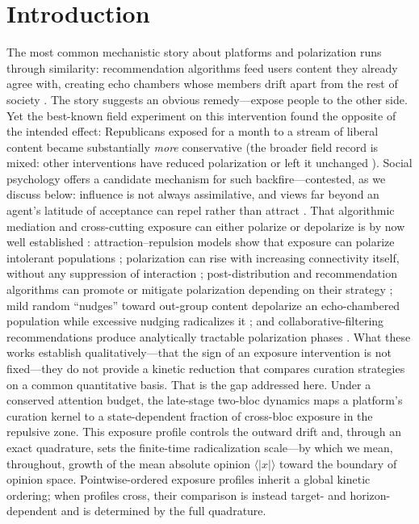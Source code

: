 \documentclass[5p,times,twocolumn]{elsarticle}
\begin{document}
\section{Introduction}
\label{sec:intro}

The most common mechanistic story about platforms and polarization runs
through similarity: recommendation algorithms feed users content they
already agree with, creating echo chambers whose members drift apart from
the rest of society \citep{sirbu2019, santos2021, baumann2020}. The story
suggests an obvious remedy---expose people to the other side. Yet the
best-known field experiment on this intervention found the opposite of the
intended effect: Republicans exposed for a month to a stream of liberal
content became substantially \emph{more} conservative \citep{bail2018}
(the broader field record is mixed: other interventions have reduced
polarization or left it unchanged \citep{levy2021, nyhan2023}). Social
psychology offers a candidate mechanism for such backfire---contested, as
we discuss below: influence is not always assimilative, and views far
beyond an agent's latitude of acceptance can repel rather than attract
\citep{jager2005, flache2017, tang2025}. That algorithmic mediation and
cross-cutting exposure can either polarize or depolarize is by now well
established \citep{starnini2025}: attraction--repulsion models show that
exposure can polarize intolerant populations \citep{axelrod2021,
sabinmiller2020}; polarization can rise with increasing connectivity
itself, without any suppression of interaction \citep{pham2026};
post-distribution and recommendation algorithms can
promote or mitigate polarization depending on their strategy
\citep{dearruda2022, pansanella2022, cinus2022}; mild random
``nudges'' toward out-group content
depolarize an echo-chambered population while excessive nudging
radicalizes it \citep{pal2023}; and collaborative-filtering
recommendations produce analytically tractable polarization phases
\citep{bellina2023}. What
these works establish qualitatively---that the sign of an exposure
intervention is not fixed---they do not provide a kinetic reduction that
compares curation strategies on a common quantitative basis. That is the
gap addressed here. Under a conserved attention budget, the late-stage
two-bloc dynamics maps a platform's curation kernel to a state-dependent
fraction of cross-bloc exposure in the repulsive zone. This exposure
profile controls the outward drift and, through an exact quadrature,
sets the finite-time radicalization scale---by which we mean, throughout,
growth of the mean absolute opinion $\langle|x|\rangle$ toward the
boundary of opinion space. Pointwise-ordered exposure profiles inherit a
global kinetic ordering; when profiles cross, their comparison is instead
target- and horizon-dependent and is determined by the full quadrature.
\end{document}
